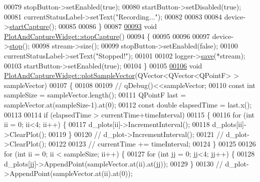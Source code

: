 \begin{DoxyCode}
00079     stopButton->setEnabled(\textcolor{keyword}{true});
00080     startButton->setDisabled(\textcolor{keyword}{true});
00081     currentStatusLabel->setText(\textcolor{stringliteral}{"Recording..."});
00082 
00083 
00084         device->\hyperlink{classDeviceManager_a30358705658f1037ef6bb98e7a2d5e80}{startCapture}();
00085   
00086 \}
00087 
\hypertarget{plotandcapturewidget_8cpp_source.tex_l00093}{}\hyperlink{classPlotAndCaptureWidget_a5f9fe948c3683ae9026a8f792782e67e}{00093} \textcolor{keywordtype}{void} \hyperlink{classPlotAndCaptureWidget_a5f9fe948c3683ae9026a8f792782e67e}{PlotAndCaptureWidget::stopCapture}()
00094 \{
00095 
00096 
00097         device->\hyperlink{classDeviceManager_a8569742b2eb08d95052506e372b6bd31}{stop}();
00098     stream->size();
00099     stopButton->setEnabled(\textcolor{keyword}{false});
00100     currentStatusLabel->setText(\textcolor{stringliteral}{"Stopped!"});
00101 
00102     logger->\hyperlink{classDataLogger_a17296a2d3088e979c9b1f48e68caf9ad}{save}(*stream);
00103     startButton->setEnabled(\textcolor{keyword}{true});
00104 \}
00105 
\hypertarget{plotandcapturewidget_8cpp_source.tex_l00106}{}\hyperlink{classPlotAndCaptureWidget_a7dca31208a65906f0a96bf4143e0da4f}{00106} \textcolor{keywordtype}{void} \hyperlink{classPlotAndCaptureWidget_a7dca31208a65906f0a96bf4143e0da4f}{PlotAndCaptureWidget::plotSampleVector}(QVector<QVector<QPointF> 
      > sampleVector)
00107 \{
00108 
00109    \textcolor{comment}{// qDebug()<<sampleVector;}
00110     \textcolor{keyword}{const} \textcolor{keywordtype}{int} sampleSize = sampleVector.length();
00111     QPointF last = sampleVector.at(sampleSize-1).at(0);
00112     \textcolor{keyword}{const} \textcolor{keywordtype}{double} elapsedTime = last.x();
00113 
00114     \textcolor{keywordflow}{if} (elapsedTime > currentTime+timeInterval)
00115     \{
00116         \textcolor{keywordflow}{for} (\textcolor{keywordtype}{int} ii = 0; ii<4; ii++) \{
00117             d\_plots[ii]->IncrementInterval();
00118             d\_plots[ii]->ClearPlot();
00119         \}
00120 \textcolor{comment}{//        d\_plot->IncrementInterval();}
00121 \textcolor{comment}{//        d\_plot->ClearPlot();}
00122 
00123 \textcolor{comment}{//        currentTime += timeInterval;}
00124     \}
00125 
00126     \textcolor{keywordflow}{for} (\textcolor{keywordtype}{int} ii = 0; ii < sampleSize; ii++) \{
00127         \textcolor{keywordflow}{for} (\textcolor{keywordtype}{int} jj = 0; jj<4; jj++) \{
00128             d\_plots[jj]->AppendPoint(sampleVector.at(ii).at(jj));
00129         \}
00130 \textcolor{comment}{//        d\_plot->AppendPoint(sampleVector.at(ii).at(0));}

\end{DoxyCode}
